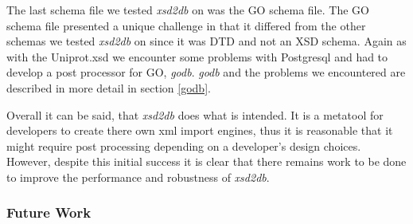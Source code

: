 The last schema file we tested \emph{xsd2db} on was the GO schema file.  The GO schema file presented a unique challenge in that it differed from the other schemas we tested \emph{xsd2db} on since it was DTD and not an XSD schema.  Again as with the Uniprot.xsd we encounter some problems with Postgresql and had to develop a post processor for GO, \emph{godb}.  \emph{godb} and the problems we encountered are described in more detail in section \ref{godb}.

Overall it can be said, that \emph{xsd2db} does what is intended.  It is a metatool for developers to create there own xml import engines, thus it is reasonable that it might require post processing depending on a developer's design choices.  However, despite this initial success it is clear that there remains work to be done to improve the performance and robustness of \emph{xsd2db}. 

\subsubsection{Future Work}

     




